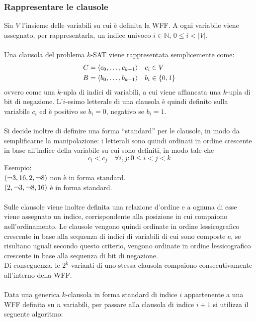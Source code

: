 \subsubsection{Rappresentare le clausole}
Sia $V$ l'insieme delle variabili su cui è definita la WFF.
A ogni variabile viene assegnato, per rappresentarla, un indice univoco $i \in \mathbb{N}$, $0 \le i < |V|$.\\
\\
Una clausola del problema $k$-SAT viene rappresentata semplicemente come:
\begin{align*}
    C &= \ang{c_0, \ldots, c_{k-1}} \quad c_i \in V\\
    B &= \ang{b_0, \ldots, b_{k-1}} \quad b_i \in \cbra{0, 1}
\end{align*}
ovvero come una $k$-upla di indici di variabili, a cui viene affiancata una $k$-upla di bit di negazione.
L'$i$-esimo letterale di una clausola è quindi definito sulla variabile $c_i$ ed è positivo se $b_i = 0$, negativo se $b_i = 1$.\\
\\
Si decide inoltre di definire una forma “standard” per le clausole, in modo da semplificarne
la manipolazione: i letterali sono quindi ordinati in ordine crescente in base 
all'indice della variabile su cui sono definiti, in modo tale che 
\begin{equation*}
    c_i < c_j \quad \forall i, j : 0 \le i < j < k
\end{equation*}
Esempio:\\
$\bra{\lnot 3, 16, 2, \lnot 8}$ non è in forma standard.\\
$\bra{2, \lnot 3, \lnot 8, 16}$ è in forma standard.\\
\\
Sulle clausole viene inoltre definita una relazione d'ordine e a ognuna di esse viene assegnato un indice, corrispondente alla posizione in cui compaiono nell'ordinamento.
Le clausole vengono quindi ordinate in ordine lessicografico crescente in base alla sequenza
di indici di variabili di cui sono composte e, se risultano uguali secondo questo criterio,
vengono ordinate in ordine lessicografico crescente in base alla sequenza di bit di negazione.\\
Di conseguenza, le $2^k$ varianti di uno stessa clausola compaiono consecutivamente all'interno della WFF.\\
\\
Data una generica $k$-clausola in forma standard di indice $i$ appartenente a una WFF definita su $n$ variabili, per passare alla clausola di indice $i+1$ si utilizza il seguente algoritmo:
